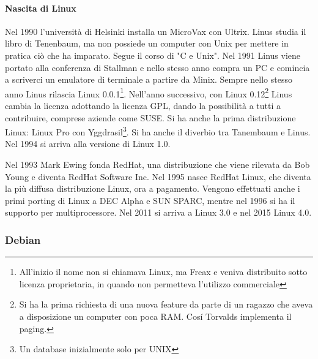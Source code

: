\paragraph*{Nascita di Linux} Nel 1990 l'universit\`a di Helsinki installa un MicroVax con Ultrix. Linus studia il libro di Tenenbaum, ma non possiede un computer con Unix per mettere in pratica ciò che ha imparato. Segue il corso di "C e Unix". Nel 1991 Linus viene portato alla conferenza di Stallman e nello stesso anno compra un PC e comincia a scriverci un emulatore di terminale a partire da Minix. Sempre nello stesso anno Linus rilascia Linux 0.0.1\footnote{All'inizio il nome non si chiamava Linux, ma Freax e veniva distribuito sotto licenza proprietaria, in quando non permetteva l'utilizzo commerciale}. Nell'anno successivo, con Linux 0.12\footnote{Si ha la prima richiesta di una nuova feature da parte di un ragazzo che aveva a disposizione un computer con poca RAM. Cosí Torvalds implementa il paging.} Linus cambia la licenza adottando la licenza GPL, dando la possibilit\`a a tutti a contribuire, comprese aziende come SUSE. Si ha anche la prima distribuzione Linux: Linux Pro con Yggdrasil\footnote{Un database inizialmente solo per UNIX}. Si ha anche il diverbio tra Tanembaum e Linus. Nel 1994 si arriva alla versione di Linux 1.0.

Nel 1993 Mark Ewing fonda RedHat, una distribuzione che viene rilevata da Bob Young e diventa RedHat Software Inc. Nel 1995 nasce RedHat Linux, che diventa la pi\`u diffusa distribuzione Linux, ora a pagamento. Vengono effettuati anche i primi porting di Linux a DEC Alpha e SUN SPARC, mentre nel 1996 si ha il supporto per multiprocessore. Nel 2011 si arriva a Linux 3.0 e nel 2015 Linux 4.0.

\subsubsection{Debian}

